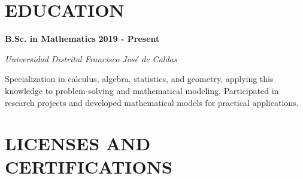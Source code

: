 \documentclass[paper=a4,fontsize=11pt]{scrartcl} %
\newcommand{\sepspace}{\vspace*{0.8em}}
\newcommand{\NewPart}[1]{\section*{\uppercase{#1}}}
\newcommand{\EducationEntry}[4]{%
  \noindent \textbf{#1} \hfill \textbf{#2} \par
  \noindent \textit{#3} \par
  \noindent \small #4 
  \normalsize \par \sepspace
}
\begin{document}
\sepspace

\NewPart{Education}

\EducationEntry{B.Sc. in Mathematics}{2019 - Present}{Universidad Distrital Francisco José de Caldas}{%
Specialization in calculus, algebra, statistics, and geometry, applying this knowledge to problem-solving and mathematical modeling. Participated in research projects and developed mathematical models for practical applications.
}

\sepspace

\NewPart{Licenses and Certifications}
\end{document}
